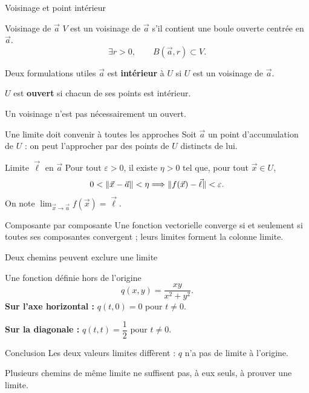 \begin{frame}[t]{Voisinage et point intérieur}
\coursanalyse
\begin{notion}{Voisinage de $\vec a$}
$V$ est un voisinage de $\vec a$ s'il contient une boule ouverte centrée en $\vec a$.
\[\exists r>0,\qquad B(\vec a,r)\subset V.\]
\end{notion}
\begin{resultat}{Deux formulations utiles}
$\vec a$ est \textbf{intérieur} à $U$ si $U$ est un voisinage de $\vec a$.

\medskip
$U$ est \textbf{ouvert} si chacun de ses points est intérieur.
\end{resultat}
\vfill Un voisinage n'est pas nécessairement un ouvert.
\end{frame}

\begin{frame}[t]{Une limite doit convenir à toutes les approches}
\coursanalyse
Soit $\vec a$ un point d'accumulation de $U$ : on peut l'approcher par des points de $U$ distincts de lui.
\begin{notion}{Limite $\vec\ell$ en $\vec a$}
Pour tout $\varepsilon>0$, il existe $\eta>0$ tel que, pour tout $\vec x\in U$,
\[0<\lVert \vec x-\vec a\rVert<\eta\Longrightarrow\lVert f(\vec x)-\vec\ell\rVert<\varepsilon.\]
On note $\displaystyle\lim_{\vec x\to\vec a}f(\vec x)=\vec\ell$.
\end{notion}
\begin{theoreme}{Composante par composante}
Une fonction vectorielle converge si et seulement si toutes ses composantes convergent ; leurs limites forment la colonne limite.
\end{theoreme}
\end{frame}

\begin{frame}[t]{Deux chemins peuvent exclure une limite}
\coursanalyse
\begin{exemple}{Une fonction définie hors de l'origine}
\[q(x,y)=\frac{xy}{x^2+y^2}.\]
\textbf{Sur l'axe horizontal :} $q(t,0)=0$ pour $t\ne0$.

\medskip
\textbf{Sur la diagonale :} $q(t,t)=\dfrac12$ pour $t\ne0$.
\end{exemple}
\begin{resultat}{Conclusion}
Les deux valeurs limites diffèrent : $q$ n'a pas de limite à l'origine.
\end{resultat}
\vfill Plusieurs chemins de même limite ne suffisent pas, à eux seuls, à prouver une limite.
\end{frame}


